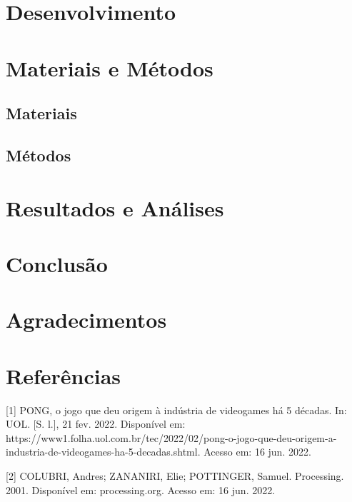 \documentclass[conference]{IEEEtran}
\begin{document}
\section{Desenvolvimento}

\section{Materiais e Métodos}

\subsection{Materiais}

\subsection{Métodos}


\section{Resultados e Análises}

\section{Conclusão}








\section*{Agradecimentos}


\section*{Referências}

[1] PONG, o jogo que deu origem à indústria de videogames há 5 décadas. In: UOL. [S. l.], 21 fev. 2022. Disponível em: https://www1.folha.uol.com.br/tec/2022/02/pong-o-jogo-que-deu-origem-a-industria-de-videogames-ha-5-decadas.shtml. Acesso em: 16 jun. 2022.

[2] COLUBRI, Andres; ZANANIRI, Elie; POTTINGER, Samuel. Processing. 2001. Disponível em: processing.org. Acesso em: 16 jun. 2022.
\end{document}
